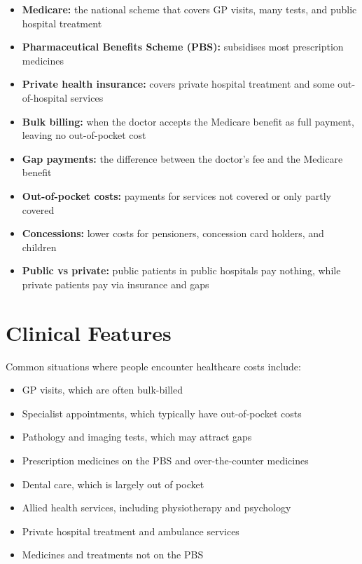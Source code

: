 \begin{itemize}
    \item \textbf{Medicare:} the national scheme that covers GP visits, many tests, and public hospital treatment
    \item \textbf{Pharmaceutical Benefits Scheme (PBS):} subsidises most prescription medicines
    \item \textbf{Private health insurance:} covers private hospital treatment and some out-of-hospital services
    \item \textbf{Bulk billing:} when the doctor accepts the Medicare benefit as full payment, leaving no out-of-pocket cost
    \item \textbf{Gap payments:} the difference between the doctor's fee and the Medicare benefit
    \item \textbf{Out-of-pocket costs:} payments for services not covered or only partly covered
    \item \textbf{Concessions:} lower costs for pensioners, concession card holders, and children
    \item \textbf{Public vs private:} public patients in public hospitals pay nothing, while private patients pay via insurance and gaps
\end{itemize}

\section*{Clinical Features}
Common situations where people encounter healthcare costs include:

\begin{itemize}
    \item GP visits, which are often bulk-billed
    \item Specialist appointments, which typically have out-of-pocket costs
    \item Pathology and imaging tests, which may attract gaps
    \item Prescription medicines on the PBS and over-the-counter medicines
    \item Dental care, which is largely out of pocket
    \item Allied health services, including physiotherapy and psychology
    \item Private hospital treatment and ambulance services
    \item Medicines and treatments not on the PBS
\end{itemize}

